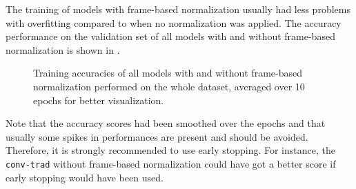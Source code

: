 \FloatBarrier
\noindent
The training of models with frame-based normalization usually had less problems with overfitting compared to when no normalization was applied.
The accuracy performance on the validation set of all models with and without frame-based normalization is shown in .
\begin{figure}[!ht]
  \centering
  \caption{Training accuracies of all models with and without frame-based normalization performed on the whole dataset, averaged over 10 epochs for better visualization.}
  \label{fig:exp_final_acc}
\end{figure}
\FloatBarrier
\noindent
Note that the accuracy scores had been smoothed over the epochs and that usually some spikes in performances are present and should be avoided.
Therefore, it is strongly recommended to use early stopping.
For instance, the \texttt{conv-trad} without frame-based normalization could have got a better score if early stopping would have been used.

